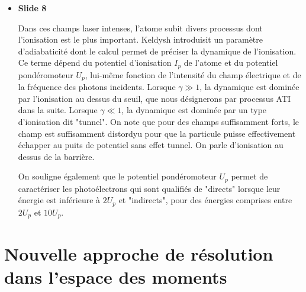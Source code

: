 \documentclass[10pt,a4paper]{article}
\begin{document}
\begin{itemize}
D'autres hamiltioniens sont aptes \`a d\'ecrire 
le syst\`eme. En effet, tout hamiltonien 
$H^\prime$ li\'e \`a un hamiltonien $H$ 
d\'ecrivant le syst\`eme par la transformation de jauge 
de seconde esp\`ece, est lui-m\^eme abilit\'e \`a decrire le 
syst\`eme.

Par exemple, on obtient l'hamiltonien en jauge longeur 
g\'en\'eralement utilis\'e dans l'espace des configurations en 
posant $\chi=\boldsymbol{A}\cdot\boldsymbol{r}$.

\item \textbf{Slide 8}\par
Dans ces champs laser intenses, 
l'atome subit divers processus dont l'ionisation est le plus important. 
Keldysh introduisit un param\`etre d'adiabaticit\'e dont le calcul permet de 
pr\'eciser la dynamique de l'ionisation.
Ce terme d\'epend du potentiel d'ionisation $I_p$ 
de l'atome et du potentiel pond\'eromoteur $U_p$, lui-m\^eme fonction 
de l'intensit\'e du champ \'electrique et de la fr\'equence des
photons incidents.
Lorsque $\gamma \gg 1$, la dynamique est domin\'ee par 
l'ionisation au dessus du seuil, que nous d\'esignerons par 
processus ATI dans la suite.
Lorsque $\gamma \ll 1$, la dynamique est domin\'ee par 
un type d'ionisation dit "tunnel".
On note que pour des champs suffisamment forts,
le champ est suffisamment distordyu pour que la particule puisse 
effectivement \'echapper au puits de potentiel sans effet tunnel. 
On parle d'ionisation au dessus de  la barri\`ere.

On souligne \'egalement que le potentiel pond\'eromoteur $U_p$
permet de caract\'eriser les photo\'electrons qui 
sont qualifi\'es de "directs" lorsque leur \'energie est inf\'erieure
\`a $2U_p$ et "indirects", pour des \'energies comprises entre
$2U_p$ et $10U_p$.

\end{itemize}

\section{Nouvelle approche de r\'esolution dans l'espace des moments}
\end{document}
